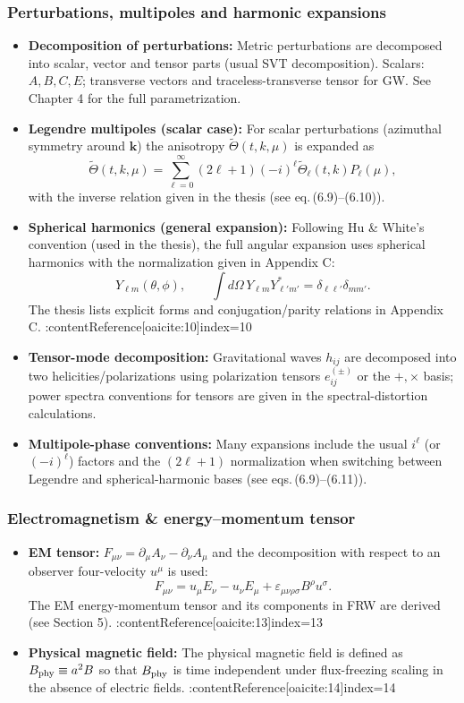 \subsubsection{Perturbations, multipoles and harmonic expansions}
\begin{itemize}
  \item \textbf{Decomposition of perturbations:} Metric perturbations are decomposed into scalar, vector and tensor parts (usual SVT decomposition). Scalars: $A,B,C,E$; transverse vectors and traceless-transverse tensor for GW. See Chapter 4 for the full parametrization. 
  \item \textbf{Legendre multipoles (scalar case):} For scalar perturbations (azimuthal symmetry around $\mathbf{k}$) the anisotropy $\tilde\Theta(t,k,\mu)$ is expanded as
  \[ \tilde\Theta(t,k,\mu)=\sum_{\ell=0}^\infty (2\ell+1)(-i)^\ell \tilde\Theta_\ell(t,k)P_\ell(\mu), \]
  with the inverse relation given in the thesis (see eq.\,(6.9)--(6.10)). 
  \item \textbf{Spherical harmonics (general expansion):} Following Hu \& White's convention (used in the thesis), the full angular expansion uses spherical harmonics with the normalization given in Appendix C:
  \[ Y_{\ell m}(\theta,\phi),\qquad \int d\Omega\,Y_{\ell m}Y_{\ell' m'}^\ast=\delta_{\ell\ell'}\delta_{mm'}. \]
  The thesis lists explicit forms and conjugation/parity relations in Appendix C. :contentReference[oaicite:10]{index=10}
  \item \textbf{Tensor-mode decomposition:} Gravitational waves $h_{ij}$ are decomposed into two helicities/polarizations using polarization tensors $e^{(\pm)}_{ij}$ or the $+,\times$ basis; power spectra conventions for tensors are given in the spectral-distortion calculations. 
  \item \textbf{Multipole-phase conventions:} Many expansions include the usual $i^\ell$ (or $(-i)^\ell$) factors and the $(2\ell+1)$ normalization when switching between Legendre and spherical-harmonic bases (see eqs.\,(6.9)--(6.11)). 
\end{itemize}

\subsubsection{Electromagnetism \& energy--momentum tensor}
\begin{itemize}
  \item \textbf{EM tensor:} $F_{\mu\nu}=\partial_\mu A_\nu-\partial_\nu A_\mu$ and the decomposition with respect to an observer four-velocity $u^\mu$ is used:
  \[ F_{\mu\nu}=u_\mu E_\nu-u_\nu E_\mu + \varepsilon_{\mu\nu\rho\sigma}B^\rho u^\sigma. \]
  The EM energy-momentum tensor and its components in FRW are derived (see Section 5). :contentReference[oaicite:13]{index=13}
  \item \textbf{Physical magnetic field:} The physical magnetic field is defined as $B_{\rm phy}\equiv a^2 B$ so that $B_{\rm phy}$ is time independent under flux-freezing scaling in the absence of electric fields. :contentReference[oaicite:14]{index=14}
\end{itemize}

